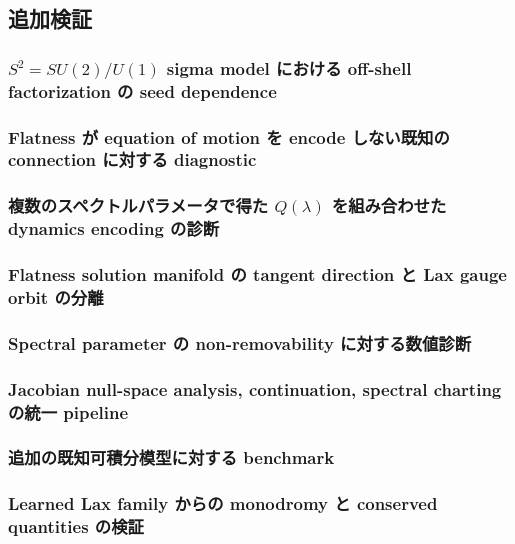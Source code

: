 \documentclass[11pt,a4paper]{ltjsarticle}
\begin{document}
\subsection{追加検証}
\subsubsection{$S^2=SU(2)/U(1)$ sigma model における off-shell factorization の seed dependence}
\subsubsection{Flatness が equation of motion を encode しない既知の connection に対する diagnostic}
\subsubsection{複数のスペクトルパラメータで得た $Q(\lambda)$ を組み合わせた dynamics encoding の診断}
\subsubsection{Flatness solution manifold の tangent direction と Lax gauge orbit の分離}
\subsubsection{Spectral parameter の non-removability に対する数値診断}
\subsubsection{Jacobian null-space analysis, continuation, spectral charting の統一 pipeline}
\subsubsection{追加の既知可積分模型に対する benchmark}
\subsubsection{Learned Lax family からの monodromy と conserved quantities の検証}
\end{document}
